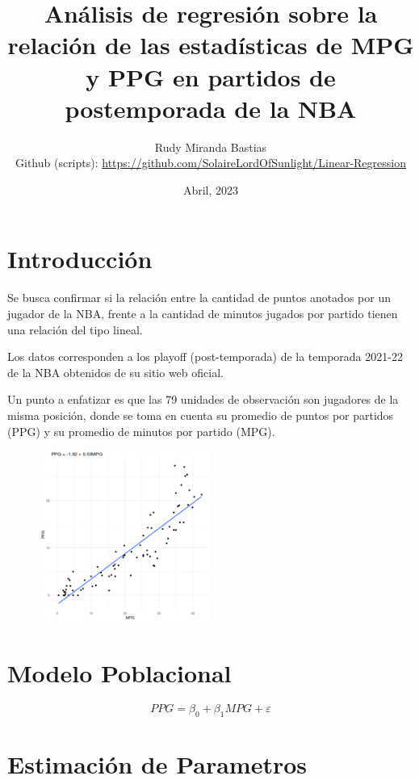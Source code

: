 \documentclass[onecolumn]{IEEEtran}
\title{An\'alisis de regresi\'on sobre la relaci\'on de las estad\'isticas de MPG y PPG en partidos de postemporada de la NBA}
\author{Rudy Miranda Bastias\\
    Github (scripts): \url{https://github.com/SolaireLordOfSunlight/Linear-Regression}
}
\date{Abril, 2023}
\begin{document}
    \maketitle

    \section{Introducci\'on}
    Se busca confirmar si la relaci\'on entre la cantidad de puntos anotados por un jugador de la NBA, frente a la cantidad de minutos jugados por partido tienen una relaci\'on del tipo lineal.

    Los datos corresponden a los playoff (post-temporada) de la temporada 2021-22 de la NBA obtenidos de su sitio web oficial.

    Un punto a enfatizar es que las 79 unidades de  observaci\'on son jugadores de la misma posici\'on, donde se toma en cuenta su promedio de puntos por partidos (PPG) y su promedio de minutos por partido (MPG).

    \begin{figure}[h]
       \centering
       \includegraphics[width=0.5\textwidth]{../plot1.png}
    \end{figure}

    \section{Modelo Poblacional}
    
    \begin{equation}
        PPG = \beta_0 + \beta_1 MPG + \varepsilon        
    \end{equation}
    
    \section{Estimaci\'on de Parametros}
\end{document}
